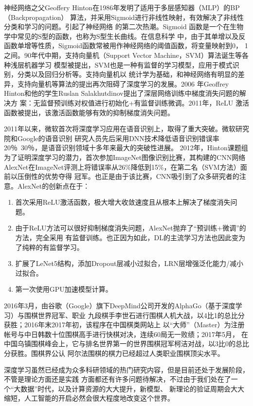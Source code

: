   神经网络之父Geoffery Hinton在1986年发明了适用于多层感知器（MLP）的BP（Backpropagation）
  算法，并采用Sigmoid进行非线性映射，有效解决了非线性分类和学习的问题。引起了神经网络
  的第二次热潮。Sigmoid 函数是一个在生物学中常见的S型的函数，也称为S型生长曲线。在信息科学
  中，由于其单增以及反函数单增等性质，Sigmoid函数常被用作神经网络的阈值函数，将变量映射到0，
  1之间。90年代中期，支持向量机（Support Vector Machine，SVM）算法诞生等各种浅层机器学习
  模型被提出，SVM也是一种有监督的学习模型，应用于模式识别，分类以及回归分析等。支持向量机以
  统计学为基础，和神经网络有明显的差异，支持向量机等算法的提出再次阻碍了深度学习的发展。2006
  年Geoffrey Hinton和他的学生Ruslan Salakhutdinov提出了深层网络训练中梯度消失问题的解决方
  案：无监督预训练对权值进行初始化+有监督训练微调\cite{hinton2006reducing}。2011年，ReLU
  激活函数被提出，该激活函数能够有效的抑制梯度消失问题。

  2011年以来，微软首次将深度学习应用在语音识别上，取得了重大突破。微软研究院和Google的语音识别
  研究人员先后采用DNN技术降低语音识别错误率20％~30％，是语音识别领域十多年来最大的突破性进展。
  2012年，Hinton课题组为了证明深度学习的潜力，首次参加ImageNet图像识别比赛，其构建的CNN网络
  AlexNet在ImageNet评测上将错误率从26\%降低到15\%，在第二名（SVM方法）面前以压倒性的优势夺得
  冠军。也正是由于该比赛，CNN吸引到了众多研究者的注意。AlexNet的创新点在于：
  
  \begin{enumerate}[(1)]
    \dawu\item 首次采用ReLU激活函数，极大增大收敛速度且从根本上解决了梯度消失问题。
    \dawu\item 由于ReLU方法可以很好抑制梯度消失问题，AlexNet抛弃了“预训练+微调”的方法，完全采用
      有监督训练。也正因为如此，DL的主流学习方法也因此变为了纯粹的有监督学习。
    \dawu\item 扩展了LeNet5结构，添加Dropout层减小过拟合，LRN层增强泛化能力/减小过拟合。
    \dawu\item 第一次使用GPU加速模型计算。
  \end{enumerate}

  2016年3月，由谷歌（Google）旗下DeepMind公司开发的AlphaGo（基于深度学习）与围棋世界冠军、职业
  九段棋手李世石进行围棋人机大战，以4比1的总比分获胜；2016年末2017年初，该程序在中国棋类网站上
  以“大师”（Master）为注册帐号与中日韩数十位围棋高手进行快棋对决，连续60局无一败绩；2017年5月，
  在中国乌镇围棋峰会上，它与排名世界第一的世界围棋冠军柯洁对战，以3比0的总比分获胜。围棋界公认
  阿尔法围棋的棋力已经超过人类职业围棋顶尖水平。

  深度学习虽然已经成为众多科研领域的热门研究内容，但是目前还处于发展阶段，不管是理论方面还是实践
  方面都还有许多问题待解决，不过由于我们处在了一个“大数据”时代，以及计算资源的大大提升，新模型、
  新理论的验证周期会大大缩短，人工智能的开启必然会很大程度地改变这个世界。
